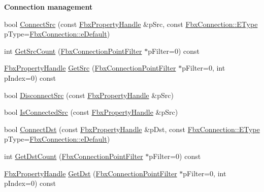 \begin{Indent}\textbf{ Connection management}\par
\begin{DoxyCompactItemize}
\item 
bool \hyperlink{class_fbx_property_handle_a9682cef8ffadfe43c594a9cf787879b1}{Connect\+Src} (const \hyperlink{class_fbx_property_handle}{Fbx\+Property\+Handle} \&p\+Src, const \hyperlink{class_fbx_connection_a3df448a5db356652ab99fd2be2553749}{Fbx\+Connection\+::\+E\+Type} p\+Type=\hyperlink{class_fbx_connection_a3df448a5db356652ab99fd2be2553749a93ca385d7cc25fef28232a2d10b836e3}{Fbx\+Connection\+::e\+Default})
\item 
int \hyperlink{class_fbx_property_handle_a10398afdaf865adc314f65ed0e689638}{Get\+Src\+Count} (\hyperlink{class_fbx_connection_point_filter}{Fbx\+Connection\+Point\+Filter} $\ast$p\+Filter=0) const
\item 
\hyperlink{class_fbx_property_handle}{Fbx\+Property\+Handle} \hyperlink{class_fbx_property_handle_a989f15be760ea7608b8db6f9090f1235}{Get\+Src} (\hyperlink{class_fbx_connection_point_filter}{Fbx\+Connection\+Point\+Filter} $\ast$p\+Filter=0, int p\+Index=0) const
\item 
bool \hyperlink{class_fbx_property_handle_a1e7e6be842dac23fce8708f182e9e8c3}{Disconnect\+Src} (const \hyperlink{class_fbx_property_handle}{Fbx\+Property\+Handle} \&p\+Src)
\item 
bool \hyperlink{class_fbx_property_handle_acf4c1984ce8574d2cb6e1300d4d3d1d6}{Is\+Connected\+Src} (const \hyperlink{class_fbx_property_handle}{Fbx\+Property\+Handle} \&p\+Src)
\item 
bool \hyperlink{class_fbx_property_handle_aae1fece6b331a3d0550df3258a89ac82}{Connect\+Dst} (const \hyperlink{class_fbx_property_handle}{Fbx\+Property\+Handle} \&p\+Dst, const \hyperlink{class_fbx_connection_a3df448a5db356652ab99fd2be2553749}{Fbx\+Connection\+::\+E\+Type} p\+Type=\hyperlink{class_fbx_connection_a3df448a5db356652ab99fd2be2553749a93ca385d7cc25fef28232a2d10b836e3}{Fbx\+Connection\+::e\+Default})
\item 
int \hyperlink{class_fbx_property_handle_a68e17d22df7c1a31bf4314ecef210b8b}{Get\+Dst\+Count} (\hyperlink{class_fbx_connection_point_filter}{Fbx\+Connection\+Point\+Filter} $\ast$p\+Filter=0) const
\item 
\hyperlink{class_fbx_property_handle}{Fbx\+Property\+Handle} \hyperlink{class_fbx_property_handle_a2e08af666df12d6e0a9e246fd67724b4}{Get\+Dst} (\hyperlink{class_fbx_connection_point_filter}{Fbx\+Connection\+Point\+Filter} $\ast$p\+Filter=0, int p\+Index=0) const

\end{DoxyCompactItemize}
\end{Indent}
